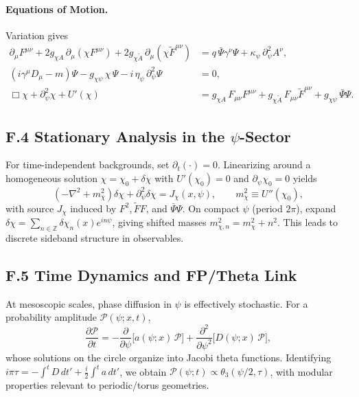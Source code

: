 \paragraph{Equations of Motion.} Variation gives
\begin{align}
\partial_\mu F^{\mu\nu} + 2g_{\chi A}\,\partial_\mu(\chi F^{\mu\nu}) + 2g_{\chi \tilde{A}}\,\partial_\mu(\chi \tilde{F}^{\mu\nu}) &= q\,\bar{\Psi}\gamma^\nu\Psi + \kappa_\psi\,\partial_\psi^2 A^\nu,\\
(i\gamma^\mu D_\mu - m)\Psi - g_{\chi \psi}\,\chi\,\Psi - i\,\eta_\psi\,\partial_\psi^2\Psi &= 0,\\
\Box \chi + \partial_\psi^2 \chi + U'(\chi) &= g_{\chi A}\,F_{\mu\nu}F^{\mu\nu} + g_{\chi \tilde{A}}\,F_{\mu\nu}\tilde{F}^{\mu\nu} + g_{\chi \psi}\,\bar{\Psi}\Psi.
\end{align}

\subsection*{F.4 Stationary Analysis in the $\psi$-Sector}
For time-independent backgrounds, set $\partial_t(\cdot)=0$. Linearizing around a homogeneous solution $\chi=\chi_0+\delta\chi$ with $U'(\chi_0)=0$ and $\partial_\psi \chi_0=0$ yields
\begin{equation}
\left(-\nabla^2 + m_\chi^2\right)\delta\chi + \partial_\psi^2 \delta\chi = J_\chi(x,\psi),
\qquad m_\chi^2 \equiv U''(\chi_0),
\end{equation}
with source $J_\chi$ induced by $F^2,\tilde F F$, and $\bar{\Psi}\Psi$. On compact $\psi$ (period $2\pi$), expand $\delta\chi=\sum_{n\in\mathbb{Z}}\delta\chi_n(x)e^{in\psi}$, giving shifted masses $m_{\chi,n}^2=m_\chi^2+n^2$. This leads to discrete sideband structure in observables.

\subsection*{F.5 Time Dynamics and FP/Theta Link}
At mesoscopic scales, phase diffusion in $\psi$ is effectively stochastic. For a probability amplitude $\mathcal{P}(\psi;x,t)$,
\begin{equation}
\frac{\partial \mathcal{P}}{\partial t} = -\frac{\partial}{\partial \psi}\!\big[a(\psi;x)\,\mathcal{P}\big] + \frac{\partial^2}{\partial \psi^2}\!\big[D(\psi;x)\,\mathcal{P}\big],
\end{equation}
whose solutions on the circle organize into Jacobi theta functions. Identifying $i\pi\tau = -\int^t D\,dt' + \tfrac{i}{2}\!\int^t a\,dt'$, we obtain $\mathcal{P}(\psi;t)\propto \theta_3(\psi/2,\tau)$, with modular properties relevant to periodic/torus geometries.

